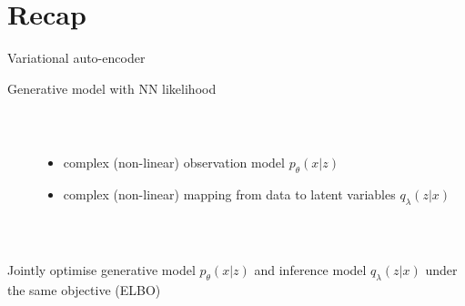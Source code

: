
\section{Recap}


\begin{frame}{Variational auto-encoder}

Generative model with NN likelihood

~

\begin{columns}
	\begin{column}{0.2\textwidth}
    \end{column}
    \begin{column}{0.7\textwidth}
    	\begin{itemize}
			\item complex (non-linear) observation model $p_\theta(x|z)$
			\item complex (non-linear) mapping from data to latent variables $q_\lambda(z|x)$
    	\end{itemize}
    \end{column}
    \end{columns}
    ~
    
    Jointly optimise generative model $p_\theta(x|z)$ and inference model $q_\lambda(z|x)$ under the same objective (ELBO)
    
\end{frame}


